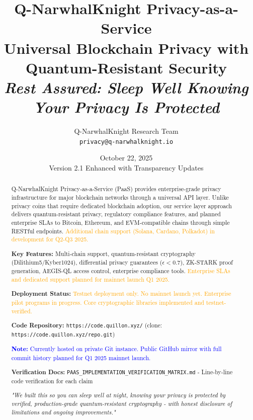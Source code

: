 \documentclass[11pt,a4paper]{article}
\title{\textbf{Q-NarwhalKnight Privacy-as-a-Service}\\
\large Universal Blockchain Privacy with Quantum-Resistant Security\\
\vspace{0.5cm}
\textit{Rest Assured: Sleep Well Knowing Your Privacy Is Protected}}
\author{Q-NarwhalKnight Research Team\\
\texttt{privacy@q-narwhalknight.io}}
\date{October 22, 2025\\Version 2.1 Enhanced with Transparency Updates}
\begin{document}
\maketitle

\begin{abstract}
\noindent
Q-NarwhalKnight Privacy-as-a-Service (PaaS) provides enterprise-grade privacy infrastructure for major blockchain networks through a universal API layer. Unlike privacy coins that require dedicated blockchain adoption, our service layer approach delivers quantum-resistant privacy, regulatory compliance features, and planned enterprise SLAs to Bitcoin, Ethereum, and EVM-compatible chains through simple RESTful endpoints. \textcolor{orange}{Additional chain support (Solana, Cardano, Polkadot) in development for Q2-Q3 2025.}

\vspace{0.3cm}
\noindent
\textbf{Key Features:} Multi-chain support, quantum-resistant cryptography (Dilithium5/Kyber1024), differential privacy guarantees ($\epsilon < 0.7$), ZK-STARK proof generation, AEGIS-QL access control, enterprise compliance tools. \textcolor{orange}{Enterprise SLAs and dedicated support planned for mainnet launch Q1 2025.}

\vspace{0.3cm}
\noindent
\textbf{Deployment Status:} \textcolor{orange}{Testnet deployment only. No mainnet launch yet. Enterprise pilot programs in progress. Core cryptographic libraries implemented and testnet-verified.}

\vspace{0.3cm}
\noindent
\textbf{Code Repository:} \texttt{https://code.quillon.xyz/} (clone: \texttt{https://code.quillon.xyz/repo.git})

\textcolor{blue}{\textbf{Note:} Currently hosted on private Git instance. Public GitHub mirror with full commit history planned for Q1 2025 mainnet launch.}

\vspace{0.3cm}
\noindent
\textbf{Verification Docs:} \texttt{PAAS\_IMPLEMENTATION\_VERIFICATION\_MATRIX.md} - Line-by-line code verification for each claim

\vspace{0.3cm}
\noindent
\textit{"We built this so you can sleep well at night, knowing your privacy is protected by verified, production-grade quantum-resistant cryptography - with honest disclosure of limitations and ongoing improvements."}
\end{abstract}
\end{document}
